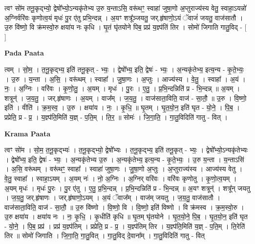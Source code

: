 \documentclass[17pt]{extarticle}
\begin{document}
त्वꣳ सो॑म तनू॒कृद्भ्यो॒ द्वेषो᳚भ्यो॒ऽन्यकृ॑तेभ्य उ॒रु य॒न्ताऽसि॒ वरू॑थꣳ॒॒ स्वाहा॑ जुषा॒णो अ॒प्तुराज्य॑स्य वेतु॒ स्वाहा॒ऽयन्नो॑ अ॒ग्निर्वरि॑वः कृणोत्व॒यं मृधः॑ पु॒र ए॑तु प्रभि॒न्दन्न्  । अ॒यꣳ शत्रू᳚ञ्जयतु॒ जर्.हृ॑षाणो॒ऽयं ॅवाजं॑ जयतु॒ वाज॑सातौ । उ॒रु वि॑ष्णो॒ वि क्र॑मस्वो॒रु क्षया॑य नः कृधि । घृ॒तं घृ॑तयोने पिब॒ प्रप्र॑ य॒ज्ञ्प॑तिं तिर । सोमो॑ जिगाति गातु॒विद् - [ ] \newline

\textbf{Pada Paata} \newline

त्वम् । सो॒म॒ । त॒नू॒कृद्भ्य॒ इति॑ तनू॒कृत् - भ्यः॒ । द्वेषो᳚भ्य॒ इति॒ द्वेषः॑ - भ्यः॒ । अ॒न्यकृ॑तेभ्य॒ इत्य॒न्य - कृ॒ते॒भ्यः॒ । उ॒रु । य॒न्ता । अ॒सि॒ । वरू॑थम् । स्वाहा᳚ । जु॒षा॒णः । अ॒प्तुः । आज्य॑स्य । वे॒तु॒ । स्वाहा᳚ । अ॒यं । नः॒ । अ॒ग्निः । वरि॑वः । कृ॒णो॒तु॒ । अ॒यम् । मृधः॑ । पु॒रः । ए॒तु॒ । प्र॒भि॒न्दन्निति॑ प्र - भि॒न्दन्न् ॥ अ॒यम् । शत्रून्॑ । ज॒य॒तु॒ । जर्.हृ॑षाणः । अ॒यम् । वाज᳚म् । ज॒य॒तु॒ । वाज॑साता॒विति॒ वाज॑ - सा॒तौ॒ ॥ उ॒रु । वि॒ष्णो॒ इति॑ । वीति॑ । क्र॒म॒स्व॒ । उ॒रु । क्षया॑य । नः॒ । कृ॒धि॒ ॥ घृ॒तम् । घृ॒त॒यो॒न॒ इति॑ घृत - यो॒ने॒ । पि॒ब॒ । प्रप्रेति॒ प्र - प्र॒ । य॒ज्ञ्प॑ति॒मिति॑ य॒ज्ञ् - प॒ति॒म् । ति॒र॒ ॥ सोमः॑ । जि॒गा॒ति॒ । गा॒तु॒विदिति॑ गातु - वित् ।  \newline


\textbf{Krama Paata} \newline

त्वꣳ सो॑म । सो॒म॒ त॒नू॒कृद्भ्यः॑ । त॒नू॒कृद्भ्यो॒ द्वेषो᳚भ्यः । त॒नू॒कृद्भ्य॒ इति॑ तनू॒कृत् - भ्यः॒ । द्वेषो᳚भ्यो॒ऽन्यकृ॑तेभ्यः । द्वेषो᳚भ्य॒ इति॒ द्वेषः॑ - भ्यः॒ । अ॒न्यकृ॑तेभ्य उ॒रु । अ॒न्यकृ॑तेभ्य॒ इत्य॒न्य - कृ॒ते॒भ्यः॒ । उ॒रु य॒न्ता । य॒न्ताऽसि॑ । अ॒सि॒ वरू॑थम् । वरू॑थꣳ॒॒ स्वाहा᳚ । स्वाहा॑ जुषा॒णः । जु॒षा॒णो अ॒प्तुः । अ॒प्तुराज्य॑स्य । आज्य॑स्य वेतु । वे॒तु॒ स्वाहा᳚ । स्वाहा॒ऽयम् । 
अ॒यम् नः॑ । नो॒ अ॒ग्निः । अ॒ग्निर् वरि॑वः । वरि॑वः कृणोतु । कृ॒णो॒त्व॒यम् । अ॒यम् मृधः॑ । मृधः॑ पु॒रः । पु॒र ए॑तु । ए॒तु॒ प्र॒भि॒न्दन्न् । प्र॒भि॒न्दन्निति॑ प्र - भि॒न्दन्न् ॥ अ॒यꣳ शत्रून्॑ । शत्रू᳚न् जयतु । ज॒य॒तु॒ जर्.हृ॑षाणः । जर्.हृ॑षाणो॒ऽयम् । अ॒यं ॅवाज᳚म् । वाज॑म् जयतु । ज॒य॒तु॒ वाज॑सातौ । वाज॑साता॒विति॒ वाज॑ - सा॒तौ॒ ॥ उ॒रु वि॑ष्णो । वि॒ष्णो॒ वि । वि॒ष्णो॒ इति॑ विष्णो । वि क्र॑मस्व । क्र॒म॒स्वो॒रु । उ॒रु क्षया॑य । क्षया॑य नः । नः॒ कृ॒धि॒ । कृ॒धीति॑ कृधि ॥ घृ॒तम् घृ॑तयोने । घृ॒त॒यो॒ने॒ पि॒ब॒ । घृ॒त॒यो॒न॒ इति॑ घृत - यो॒ने॒ । पि॒ब॒ प्रप्र॑ । प्रप्र॑ य॒ज्ञ्प॑तिम् । प्रप्रेति॒ प्र - प्र॒ । य॒ज्ञ्प॑तिम् तिर । य॒ज्ञ्प॑ति॒मिति॑ य॒ज्ञ् - प॒ति॒म् । ति॒रेति॑ तिर ॥ सोमो॑ जिगाति । जि॒गा॒ति॒ गा॒तु॒वित् । गा॒तु॒विद् दे॒वाना᳚म् । गा॒तु॒विदिति॑ गातु - वित् \newline
\end{document}
